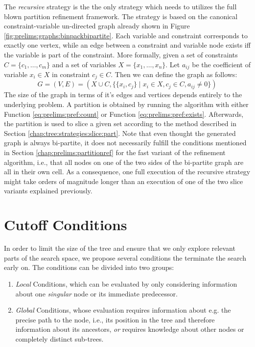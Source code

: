 			The \textit{recursive} strategy is the the only strategy which needs to utilizes the full blown partition refinement framework.
			The strategy is based on the canonical constraint-variable un-directed graph already shown in Figure \ref{fig:prelims:graphs:binpackbipartite}.
			Each variable and constraint corresponds to exactly one vertex, while an edge between a constraint and variable node exists iff the variable is part of the constraint.
			More formally, given a set of constraints $C = \{ c_1, \ldots, c_m \}$ and a set of variables $X = \{ x_1, \ldots, x_n \}$. Let $a_{ij}$ be the coefficient of variable $x_i \in X$ in constraint $c_j \in C$.
			Then we can define the graph as follows:
			\begin{equation*}
				G = (V, E) = (X \cup C, \{ \{ x_i, c_j \} \mid x_i \in X, c_j \in C, a_{ij} \neq 0 \})
			\end{equation*}
			The size of the graph in terms of it's edges and vertices depends entirely to the underlying problem.
			A partition is obtained by running the algorithm with either Function \ref{eq:prelims:pref:count} or Function \ref{eq:prelims:pref:exists}.
			Afterwards, the partition is used to slice a given set according to the method described in Section \ref{chap:tree:strategies:slice:part}.
			Note that even thought the generated graph is always bi-partite, it does not necessarily fulfill the conditions mentioned in Section \ref{chap:prelims:partitionref} for the fast variant of the refinement algorithm, i.e., that all nodes on one of the two sides of the bi-partite graph are all in their own cell.
			As a consequence, one full execution of the recursive strategy might take orders of magnitude longer than an execution of one of the two slice variants explained previously. 

			\clearpage

	\section{Cutoff Conditions}
	\label{chap:impl:cutoff}

		In order to limit the size of the tree and ensure that we only explore relevant parts of the search space, we propose several conditions the terminate the search early on.
		The conditions can be divided into two groups:

		\begin{enumerate}
			\item \textit{Local} Conditions, which can be evaluated by only considering information about one \textit{singular} node or its immediate predecessor.
			\item \textit{Global} Conditions, whose evaluation requires information about e.g. the precise path to the node, i.e., its position in the tree and therefore information about its ancestors, \textit{or} requires knowledge about other nodes or completely distinct sub-trees.
		\end{enumerate}

